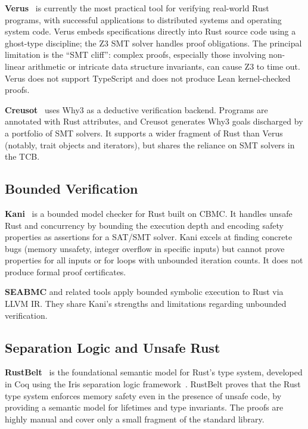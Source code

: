 \textbf{Verus}~\cite{verus2023} is currently the most practical tool for
verifying real-world Rust programs, with successful applications to distributed
systems and operating system code. Verus embeds specifications directly into
Rust source code using a ghost-type discipline; the Z3 SMT solver handles
proof obligations. The principal limitation is the ``SMT cliff'': complex
proofs, especially those involving non-linear arithmetic or intricate data
structure invariants, can cause Z3 to time out. Verus does not support
TypeScript and does not produce Lean kernel-checked proofs.

\textbf{Creusot}~\cite{creusot2022} uses Why3 as a deductive verification
backend. Programs are annotated with Rust attributes, and Creusot generates
Why3 goals discharged by a portfolio of SMT solvers. It supports a wider
fragment of Rust than Verus (notably, trait objects and iterators), but
shares the reliance on SMT solvers in the TCB.

\subsection{Bounded Verification}

\textbf{Kani}~\cite{kani2022} is a bounded model checker for Rust built on
CBMC. It handles unsafe Rust and concurrency by bounding the execution depth
and encoding safety properties as assertions for a SAT/SMT solver. Kani
excels at finding concrete bugs (memory unsafety, integer overflow in specific
inputs) but cannot prove properties for all inputs or for loops with
unbounded iteration counts. It does not produce formal proof certificates.

\textbf{SEABMC} and related tools apply bounded symbolic execution to
Rust via LLVM IR. They share Kani's strengths and limitations regarding
unbounded verification.

\subsection{Separation Logic and Unsafe Rust}

\textbf{RustBelt}~\cite{rustbelt2018} is the foundational semantic model
for Rust's type system, developed in Coq using the Iris separation logic
framework~\cite{iris2015}. RustBelt proves that the Rust type system
enforces memory safety even in the presence of unsafe code, by providing
a semantic model for lifetimes and type invariants. The proofs are highly
manual and cover only a small fragment of the standard library.

